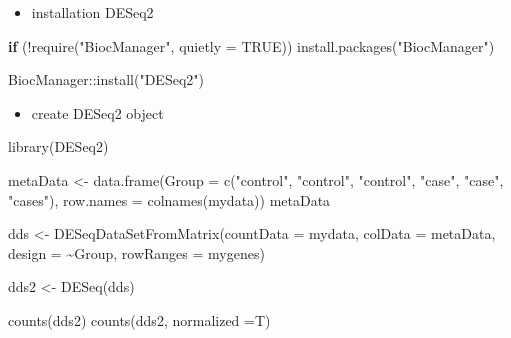 \documentclass[
]{book}
\newenvironment{Shaded}{\begin{snugshade}}{\end{snugshade}}
\newcommand{\AttributeTok}[1]{\textcolor[rgb]{0.77,0.63,0.00}{#1}}
\newcommand{\ConstantTok}[1]{\textcolor[rgb]{0.00,0.00,0.00}{#1}}
\newcommand{\ControlFlowTok}[1]{\textcolor[rgb]{0.13,0.29,0.53}{\textbf{#1}}}
\newcommand{\FunctionTok}[1]{\textcolor[rgb]{0.00,0.00,0.00}{#1}}
\newcommand{\NormalTok}[1]{#1}
\newcommand{\OtherTok}[1]{\textcolor[rgb]{0.56,0.35,0.01}{#1}}
\newcommand{\SpecialCharTok}[1]{\textcolor[rgb]{0.00,0.00,0.00}{#1}}
\newcommand{\StringTok}[1]{\textcolor[rgb]{0.31,0.60,0.02}{#1}}
\providecommand{\tightlist}{%
  \setlength{\itemsep}{0pt}\setlength{\parskip}{0pt}}
\begin{document}
\begin{itemize}
\tightlist
\item
  installation DESeq2
\end{itemize}

\begin{Shaded}
\begin{Highlighting}[]
\ControlFlowTok{if}\NormalTok{ (}\SpecialCharTok{!}\FunctionTok{require}\NormalTok{(}\StringTok{"BiocManager"}\NormalTok{, }\AttributeTok{quietly =} \ConstantTok{TRUE}\NormalTok{))}
    \FunctionTok{install.packages}\NormalTok{(}\StringTok{"BiocManager"}\NormalTok{)}

\NormalTok{BiocManager}\SpecialCharTok{::}\FunctionTok{install}\NormalTok{(}\StringTok{"DESeq2"}\NormalTok{)}
\end{Highlighting}
\end{Shaded}

\begin{itemize}
\tightlist
\item
  create DESeq2 object
\end{itemize}

\begin{Shaded}
\begin{Highlighting}[]
\FunctionTok{library}\NormalTok{(DESeq2)}

\NormalTok{metaData }\OtherTok{\textless{}{-}} \FunctionTok{data.frame}\NormalTok{(}\AttributeTok{Group =} \FunctionTok{c}\NormalTok{(}\StringTok{"control"}\NormalTok{, }\StringTok{"control"}\NormalTok{, }\StringTok{"control"}\NormalTok{, }\StringTok{"case"}\NormalTok{, }\StringTok{"case"}\NormalTok{, }\StringTok{"cases"}\NormalTok{), }\AttributeTok{row.names =} \FunctionTok{colnames}\NormalTok{(mydata))}
\NormalTok{metaData}

\NormalTok{dds }\OtherTok{\textless{}{-}} \FunctionTok{DESeqDataSetFromMatrix}\NormalTok{(}\AttributeTok{countData =}\NormalTok{ mydata,}
                      \AttributeTok{colData =}\NormalTok{ metaData,}
                      \AttributeTok{design =} \SpecialCharTok{\textasciitilde{}}\NormalTok{Group,}
                      \AttributeTok{rowRanges =}\NormalTok{ mygenes)}

\NormalTok{dds2 }\OtherTok{\textless{}{-}} \FunctionTok{DESeq}\NormalTok{(dds)}

\FunctionTok{counts}\NormalTok{(dds2)}
\FunctionTok{counts}\NormalTok{(dds2, }\AttributeTok{normalized =}\NormalTok{T)}
\end{Highlighting}
\end{Shaded}
\end{document}

